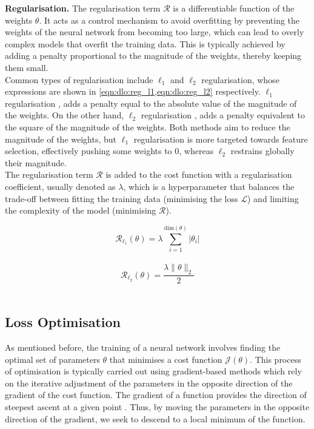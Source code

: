 \noindent \textbf{Regularisation.} The regularisation term $\mathcal{R}$ is a
differentiable function of the weights $\theta$. It acts as a control mechanism
to avoid overfitting by preventing the weights of the neural network from
becoming too large, which can lead to overly complex models that overfit the
training data. This is typically achieved by adding a penalty proportional to
the magnitude of the weights, thereby keeping them small.\\

Common types of regularisation include $\ell_1$ and $\ell_2$ regularisation,
whose expressions are shown in \cref{eqn:dlo:reg_l1,eqn:dlo:reg_l2}
respectively. $\ell_1$ regularisation \cite{tibshirani1996regression}, adds a
penalty equal to the absolute value of the magnitude of the weights. On the
other hand, $\ell_2$ regularisation \cite{hoerl1970ridge}, adds a penalty
equivalent to the square of the magnitude of the weights. Both methods aim to
reduce the magnitude of the weights, but $\ell_1$ regularisation is more
targeted towards feature selection, effectively pushing some weights to $0$,
whereas $\ell_2$ restrains globally their magnitude.\\

The regularisation term $\mathcal{R}$ is added to the cost function with a
regularisation coefficient, usually denoted as $\lambda$, which is a
hyperparameter that balances the trade-off between fitting the training data
(minimising the loss $\mathcal{L}$) and limiting the complexity of the model
(minimising $\mathcal{R}$).

\begin{equation}
  \label{eqn:dlo:reg_l1}
  \mathcal{R}_{\ell_1}(\theta) = \lambda \sum_{i=1}^{\text{dim}(\theta)} \left| \theta_i \right|
\end{equation}\\

\begin{equation}
  \label{eqn:dlo:reg_l2}
  \mathcal{R}_{\ell_2}(\theta) = \frac{\lambda \| \theta \|_2}{2} 
\end{equation}\\

\subsection{Loss Optimisation}\label{sec:dlo:backpropagation}

As mentioned before, the training of a neural network involves finding the
optimal set of parameters $\theta$ that minimises a cost function
$\mathcal{J}(\theta)$. This process of optimisation is typically carried out
using gradient-based methods which rely on the iterative adjustment of the
parameters in the opposite direction of the gradient of the cost function. The
gradient of a function provides the direction of steepest ascent at a given
point \cite{boyd2004convex}. Thus, by moving the parameters in the opposite
direction of the gradient, we seek to descend to a local minimum of the
function.\\

